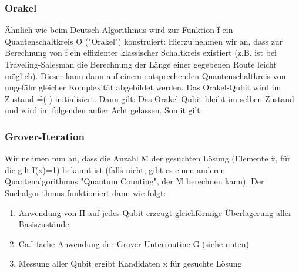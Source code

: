 \subsubsection{Orakel}
Ähnlich wie beim Deutsch-Algorithmus wird zur Funktion \f{f} ein Quantenschaltkreis \f{O} ("Orakel") konstruiert:
Hierzu nehmen wir an, dass zur Berechnung von \f{f} ein effizienter klassischer Schaltkreis existiert (z.B. ist bei Traveling-Salesman die Berechnung der Länge einer gegebenen Route leicht möglich). Dieser kann dann auf einem entsprechenden Quantenschaltkreis von ungefähr gleicher Komplexität abgebildet werden. 
Das Orakel-Qubit  wird im Zustand \f{=(-)} initialisiert. Dann gilt:
Das Orakel-Qubit bleibt im selben Zustand und wird im folgenden außer Acht gelassen. Somit gilt:

\subsubsection{Grover-Iteration}
Wir nehmen nun an, dass die Anzahl \f{M} der gesuchten Lösung (Elemente \f{x}, für die gilt \f{f(x)=1}) bekannt ist (falls nicht, gibt es einen anderen Quantenalgorithmus "Quantum Counting", der \f{M} berechnen kann). Der Suchalgorithmus funktioniert dann wie folgt:
\begin{enumerate}
    \item Anwendung von \f{H} auf jedes Qubit erzeugt gleichförmige Überlagerung aller Basiszustände:
    \item Ca. \f{}-fache Anwendung der Grover-Unterroutine \f{G} (siehe unten)
    \item Messung aller Qubit ergibt Kandidaten \f{x} für gesuchte Lösung
\end{enumerate}

